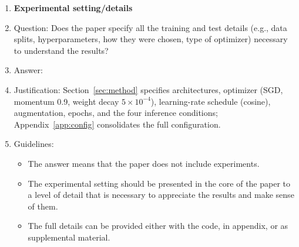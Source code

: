 \documentclass{article}
\begin{document}
\begin{enumerate}
\item {\bf Experimental setting/details}
    \item[] Question: Does the paper specify all the training and test details (e.g., data splits, hyperparameters, how they were chosen, type of optimizer) necessary to understand the results?
    \item[] Answer: \answerYes{}
    \item[] Justification: Section~\ref{sec:method} specifies architectures, optimizer (SGD, momentum 0.9, weight decay $5\times 10^{-4}$), learning-rate schedule (cosine), augmentation, epochs, and the four inference conditions; Appendix~\ref{app:config} consolidates the full configuration.
    \item[] Guidelines:
    \begin{itemize}
        \item The answer \answerNA{} means that the paper does not include experiments.
        \item The experimental setting should be presented in the core of the paper to a level of detail that is necessary to appreciate the results and make sense of them.
        \item The full details can be provided either with the code, in appendix, or as supplemental material.
    \end{itemize}


\end{enumerate}
\end{document}
